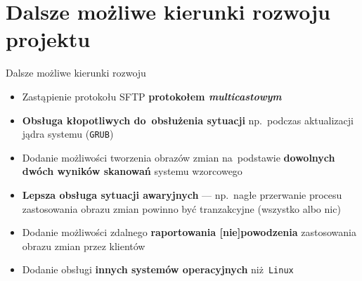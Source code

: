 \documentclass[notes,polish,xcolor=dvipsnames,hyperref={unicode,hidelinks,pdftex,pdfauthor={Patryk Bęza},pdftitle={Protokół zarządzania stacjami komputerowymi pod kontrolą systemu Linux},pdfsubject={Praca dyplomowa magisterska na Wydziale Matematyki i Nauk Informacyjnych Politechniki Warszawskiej},pdfkeywords={Software Configuration Management, SCM, Infrastructure as Code, IaC, Linux, Communications Protocol},pdfproducer={XeLaTeX},pdfcreator={latexmk}}]{beamer}
\begin{document}

\section{Dalsze możliwe kierunki rozwoju projektu}

\begin{frame}{Dalsze możliwe kierunki rozwoju}

\begin{itemize}
	\item Zastąpienie protokołu SFTP \textbf{protokołem \emph{multicastowym}}
	\item \textbf{Obsługa kłopotliwych do~obsłużenia sytuacji} np.~podczas aktualizacji jądra systemu (\texttt{GRUB})
	\item Dodanie możliwości tworzenia obrazów zmian na~podstawie \textbf{dowolnych dwóch wyników skanowań} systemu wzorcowego
	\item \textbf{Lepsza obsługa sytuacji awaryjnych} --- np.~nagłe przerwanie procesu zastosowania obrazu zmian powinno być tranzakcyjne (wszystko albo nic)
	\item Dodanie możliwości zdalnego \textbf{raportowania [nie]powodzenia} zastosowania obrazu zmian przez klientów
	\item Dodanie obsługi \textbf{innych systemów operacyjnych} niż~\texttt{Linux}
\end{itemize}

\end{frame}

%
%
%
%
\end{document}
